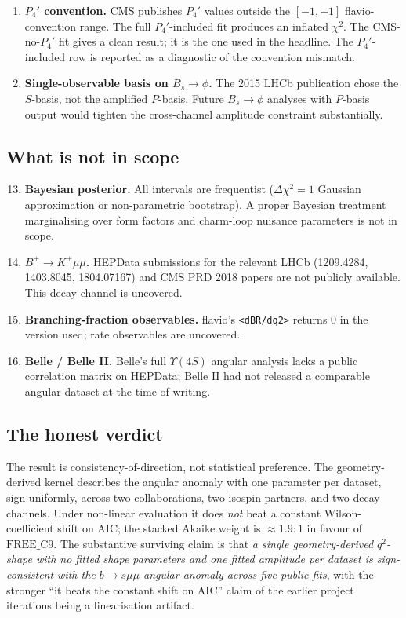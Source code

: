 \begin{enumerate}
\item \textbf{$P_{4}'$ convention.} CMS publishes $P_{4}'$ values
  outside the $[-1, +1]$ flavio-convention range. The full
  $P_{4}'$-included fit produces an inflated $\chi^{2}$. The
  CMS-no-$P_{4}'$ fit gives a clean result; it is the one used in
  the headline. The $P_{4}'$-included row is reported as a
  diagnostic of the convention mismatch.

\item \textbf{Single-observable basis on $B_{s}\to\phi$.} The 2015
  LHCb publication chose the $S$-basis, not the amplified $P$-basis.
  Future $B_{s}\to\phi$ analyses with $P$-basis output would tighten
  the cross-channel amplitude constraint substantially.
\end{enumerate}

\subsection{What is not in scope}

\begin{enumerate}\setcounter{enumi}{12}
\item \textbf{Bayesian posterior.} All intervals are frequentist
  ($\Delta\chi^{2}=1$ Gaussian approximation or non-parametric
  bootstrap). A proper Bayesian treatment marginalising over form
  factors and charm-loop nuisance parameters is not in scope.

\item \textbf{$B^{+}\to K^{+}\mu\mu$.} HEPData submissions for the
  relevant LHCb (1209.4284, 1403.8045, 1804.07167) and CMS PRD 2018
  papers are not publicly available. This decay channel is
  uncovered.

\item \textbf{Branching-fraction observables.} flavio's
  \texttt{<dBR/dq2>} returns $0$ in the version used; rate observables
  are uncovered.

\item \textbf{Belle / Belle II.} Belle's full $\Upsilon(4S)$ angular
  analysis lacks a public correlation matrix on HEPData; Belle II had
  not released a comparable angular dataset at the time of writing.
\end{enumerate}

\subsection{The honest verdict}

The result is consistency-of-direction, not statistical preference.
The geometry-derived kernel describes the angular anomaly with one
parameter per dataset, sign-uniformly, across two collaborations,
two isospin partners, and two decay channels. Under non-linear
evaluation it does \emph{not} beat a constant Wilson-coefficient shift
on AIC; the stacked Akaike weight is $\approx 1.9{:}1$ in favour of
$\mathrm{FREE\_C9}$. The substantive surviving claim is that
\emph{a single geometry-derived $q^{2}$-shape with no fitted shape
parameters and one fitted amplitude per dataset is sign-consistent
with the $b\to s\mu\mu$ angular anomaly across five public fits}, with
the stronger ``it beats the constant shift on AIC'' claim of the
earlier project iterations being a linearisation artifact.
